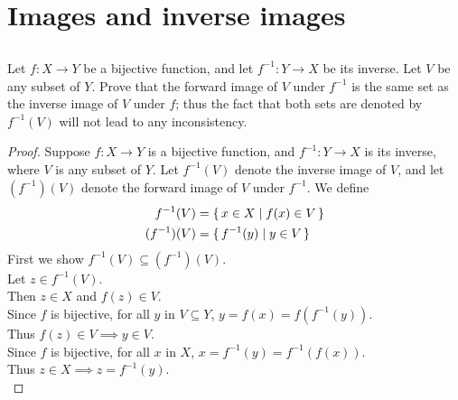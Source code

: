 \documentclass[../../main.tex]{subfiles}
\begin{document}
\ifmainfile
\else
    \ifchapfile
    \else
        \addtocounter{chapter}{3}
        \addtocounter{section}{3}
        \makeatletter
        \begin{flushright}
            \@title \\
            \@author \\
            \@date
        \end{flushright}
    \fi
\fi

\section{Images and inverse images}
\subsection{}
\begin{q}
    Let $f \colon X \to Y$ be a bijective function, and let $f^{-1} \colon Y \to X$ be its inverse. Let $V$ be any subset of $Y$. Prove that the forward image of $V$ under $f^{-1}$ is the same set as the inverse image of $V$ under $f$; thus the fact that both sets are denoted by $f^{-1}(V)$ will not lead to any inconsistency.
\end{q}
    
\begin{proof}
    Suppose $f \colon X \to Y$ is a bijective function, and $f^{-1} \colon Y \to X$ is its inverse, where $V$ is any subset of $Y$.
    Let $f^{-1}(V)$ denote the inverse image of $V$, and let $(f^{-1})(V)$ denote the forward image of $V$ under $f^{-1}$.
    We define
    \begin{equation*}
    \begin{aligned}
        f^{-1}(V) &= \{\,x \in X\mid f(x) \in V\,\} \\
        (f^{-1})(V) &= \{\,f^{-1}(y)\mid y \in V\,\}
    \end{aligned}
    \end{equation*}
    First we show $f^{-1}(V) \subseteq (f^{-1})(V)$. \\
    Let $z \in f^{-1}(V)$. \\
    Then $z \in X$ and $f(z) \in V$. \\
    Since $f$ is bijective, for all $y$ in $V \subseteq Y$, $y = f(x) = f(f^{-1}(y))$.\\
    Thus $f(z) \in V \implies y \in V$. \\
    Since $f$ is bijective, for all $x$ in $X$, $x = f^{-1}(y) = f^{-1}(f(x))$.\\
    Thus $z \in X \implies z = f^{-1}(y)$. \\




\end{proof}
\end{document}
